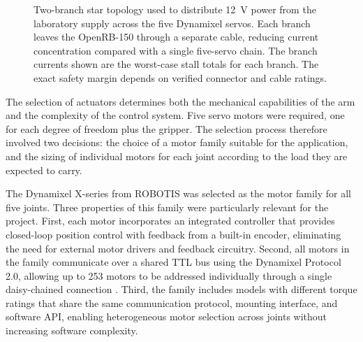 \begin{figure}[H]
    \caption[Two-branch star topology for distributing 12\,V power across five Dynamixel servos.]{Two-branch star topology used to distribute 12~V power 
    from the laboratory supply across the five Dynamixel servos. Each 
    branch leaves the OpenRB-150 through a separate cable, reducing 
    current concentration compared with a single five-servo chain. The 
    branch currents shown are the worst-case stall totals for each 
    branch. The exact safety margin depends on verified connector and 
    cable ratings.}
    \label{fig:power_topology}
\end{figure}


The selection of actuators determines both the mechanical 
capabilities of the arm and the complexity of the control system. 
Five servo motors were required, one for each degree of freedom 
plus the gripper. The selection process therefore involved two 
decisions: the choice of a motor family suitable for the 
application, and the sizing of individual motors for each joint 
according to the load they are expected to carry.

\label{sec:motor-family}
The Dynamixel X-series from ROBOTIS was selected as the motor 
family for all five joints. Three properties of this family were 
particularly relevant for the project. First, each motor 
incorporates an integrated controller that provides closed-loop 
position control with feedback from a built-in encoder, eliminating 
the need for external motor drivers and feedback circuitry. Second, 
all motors in the family communicate over a shared TTL bus using 
the Dynamixel Protocol 2.0, allowing up to 253 motors to be 
addressed individually through a single daisy-chained connection 
\cite{robotis_dynamixel}. Third, the family includes models with 
different torque ratings that share the same communication 
protocol, mounting interface, and software API, enabling 
heterogeneous motor selection across joints without increasing 
software complexity.


